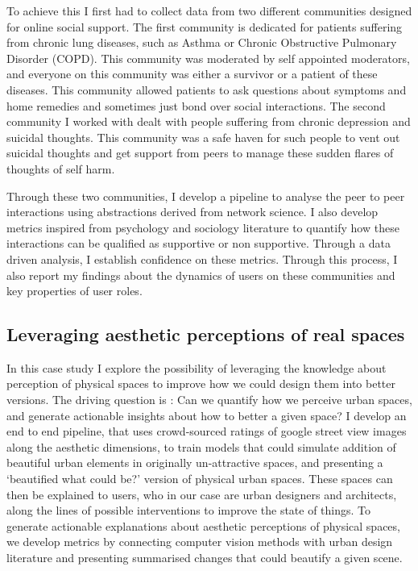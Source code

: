 To achieve this I first had to collect data from two different communities designed for online social support. The first community is dedicated for patients suffering from chronic lung diseases, such as Asthma or Chronic Obstructive Pulmonary Disorder (COPD). This community was moderated by self appointed moderators, and everyone on this community was either a survivor or a patient of these diseases. This community allowed patients to ask questions about symptoms and home remedies and sometimes just bond over social interactions. The second community I worked with dealt with people suffering from chronic depression and suicidal thoughts. This community was a safe haven for such people to vent out suicidal thoughts and get support from peers to manage these sudden flares of thoughts of self harm. 

Through these two communities, I develop a pipeline to analyse the peer to peer interactions using abstractions derived from network science. I also develop metrics inspired from psychology and sociology literature to quantify how these interactions can be qualified as supportive or non supportive. Through a data driven analysis, I establish confidence on these metrics. Through this process, I also report my findings about the dynamics of users on these communities and key properties of user roles. 

\subsection{Leveraging aesthetic perceptions of real spaces}
In this case study I explore the possibility of leveraging the knowledge about perception of physical spaces to improve how we could design them into better versions. The driving question is : Can we quantify how we perceive urban spaces, and generate actionable insights about how to better a given space?  I develop an end to end pipeline, that uses crowd-sourced ratings of google street view images along the aesthetic dimensions, to train models that could simulate addition of beautiful urban elements in originally un-attractive spaces, and presenting a `beautified what could be?' version of physical urban spaces. These spaces can then be explained to users, who in our case are urban designers and architects, along the lines of possible interventions to improve the state of things. To generate actionable  explanations about aesthetic perceptions of physical spaces, we develop metrics by connecting computer vision methods with urban design literature and presenting summarised changes that could beautify a given scene. 

